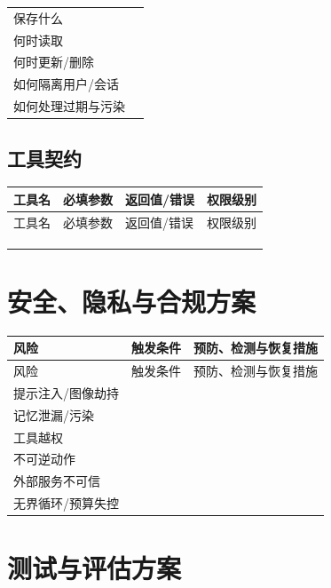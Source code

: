 \documentclass[UTF8,zihao=-4]{ctexart}
\begin{document}
\begin{tabularx}{\textwidth}{L{3.2cm} Y}
\toprule
保存什么 &\\[1.5cm]
何时读取 &\\[1.5cm]
何时更新/删除 &\\[1.5cm]
如何隔离用户/会话 &\\[1.5cm]
如何处理过期与污染 &\\[1.5cm]
\bottomrule
\end{tabularx}

\subsection{工具契约}

\begin{longtable}{L{3.2cm} L{3cm} L{6.0cm} L{2.5cm}}
\toprule
工具名 & 必填参数 & 返回值/错误 & 权限级别\\
\midrule
\endfirsthead
\toprule
工具名 & 必填参数 & 返回值/错误 & 权限级别\\
\midrule
\endhead
 & & &\\[1.2cm]
 & & &\\[1.2cm]
 & & &\\[1.2cm]
\bottomrule
\end{longtable}

\section{安全、隐私与合规方案}


\begin{longtable}{L{3.3cm} L{3.4cm} L{8.0cm}}
\toprule
风险 & 触发条件 & 预防、检测与恢复措施\\
\midrule
\endfirsthead
\toprule
风险 & 触发条件 & 预防、检测与恢复措施\\
\midrule
\endhead
提示注入/图像劫持 & &\\[1.4cm]
记忆泄漏/污染 & &\\[1.4cm]
工具越权 & &\\[1.4cm]
不可逆动作 & &\\[1.4cm]
外部服务不可信 & &\\[1.4cm]
无界循环/预算失控 & &\\[1.4cm]
\bottomrule
\end{longtable}

\section{测试与评估方案}
\end{document}
